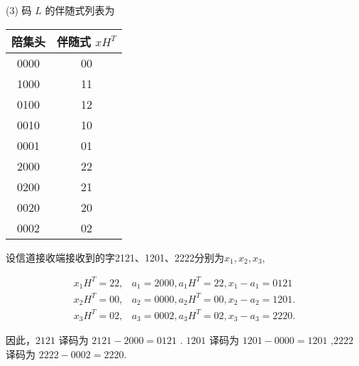 \begin{tcolorbox}[breakable,colback=blue!5!white,colframe=blue!75!black,
 title= 解答题]
(3)%
码 $L$ 的伴随式列表为
\begin{center}
\begin{tabular}{c||c}
\hline 陪集头 & 伴随式 $xH^{T}$ \\
\hline 0000 & 00 \\
1000 & 11 \\
0100 & 12 \\
0010 & 10 \\
0001 & 01 \\
2000 & 22 \\
0200 & 21 \\
0020 & 20 \\
0002 & 02 \\
\hline
\end{tabular}
\end{center}

设信道接收端接收到的字2121、1201、2222分别为$x_1,x_2,x_3$,

$$
\begin{array}{ll}
x_{1} H^{T}=22, & a_{1}=2000, a_{1} H^{T}=22, x_{1}-a_{1}=0121 \\
x_{2} H^{T}=00, & a_{2}=0000, a_{2} H^{T}=00, x_{2}-a_{2}=1201 . \\
x_{3} H^{T}=02, & a_{3}=0002, a_{3} H^{T}=02, x_{3}-a_{3}=2220 .
\end{array}
$$

因此，$2121 $ 译码为 $ 2121-2000=0121$ . $1201 $ 译码为 $ 1201-0000=  1201$ ,$2222 $ 译码为 $ 2222-0002=2220 $.
\end{tcolorbox}

\newpage

